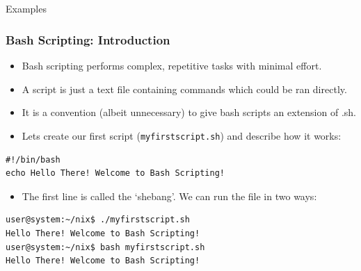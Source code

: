 \documentclass[10pt]{beamer}
\begin{document}
\subsection{}
\begin{frame}[fragile]{Examples}
\frametitle{Bash Scripting: Introduction}
\begin{itemize}
\item Bash scripting performs complex, repetitive tasks with minimal effort.\vspace{0.1in}
\item A script is just a text file containing commands which could be ran directly.\vspace{0.1in}
\item It is a convention (albeit unnecessary) to give bash scripts an extension of .sh.\vspace{0.1in}
\item Lets create our first script (\texttt{myfirstscript.sh}) and describe how it works:\vspace{0.1in}
\end{itemize}
\begin{lstlisting}[style=BashInputStyle]
#!/bin/bash
echo Hello There! Welcome to Bash Scripting!
\end{lstlisting}\vspace{0.1in}
\begin{itemize}
\item The first line is called the `shebang'. We can run the file in two ways:\vspace{0.1in}
\end{itemize}
\begin{lstlisting}[style=BashInputStyle]
user@system:~/nix$ ./myfirstscript.sh
Hello There! Welcome to Bash Scripting!
user@system:~/nix$ bash myfirstscript.sh
Hello There! Welcome to Bash Scripting!
\end{lstlisting}\vspace{0.1in}
\end{frame}
\end{document}
